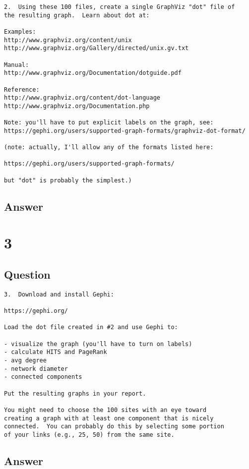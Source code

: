 \documentclass[letterpaper,11pt]{article}
\begin{document}
\begin{verbatim}
2.  Using these 100 files, create a single GraphViz "dot" file of
the resulting graph.  Learn about dot at:

Examples:
http://www.graphviz.org/content/unix
http://www.graphviz.org/Gallery/directed/unix.gv.txt

Manual:
http://www.graphviz.org/Documentation/dotguide.pdf

Reference:
http://www.graphviz.org/content/dot-language
http://www.graphviz.org/Documentation.php

Note: you'll have to put explicit labels on the graph, see:
https://gephi.org/users/supported-graph-formats/graphviz-dot-format/

(note: actually, I'll allow any of the formats listed here:

https://gephi.org/users/supported-graph-formats/

but "dot" is probably the simplest.)
\end{verbatim}

\newpage
\subsection*{Answer}

\newpage
\section*{3}

\subsection*{Question}

\begin{verbatim}
3.  Download and install Gephi:

https://gephi.org/

Load the dot file created in #2 and use Gephi to:

- visualize the graph (you'll have to turn on labels)
- calculate HITS and PageRank
- avg degree
- network diameter
- connected components

Put the resulting graphs in your report.

You might need to choose the 100 sites with an eye toward
creating a graph with at least one component that is nicely
connected.  You can probably do this by selecting some portion
of your links (e.g., 25, 50) from the same site.  
\end{verbatim}

\newpage
\subsection*{Answer}


\clearpage


\end{document}
